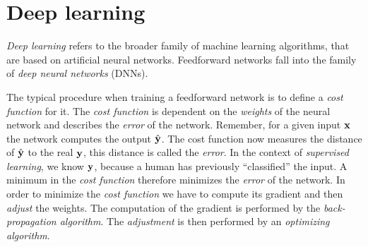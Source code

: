 \section{Deep learning}
\label{sec:deep-learning}

\emph{Deep learning} refers to the broader family of machine learning algorithms, that are based on artificial neural networks.
Feedforward networks fall into the family of \emph{deep neural networks} (DNNs).

The typical procedure when training a feedforward network is to define a \emph{cost function} for it.
The \emph{cost function} is dependent on the \emph{weights} of the neural network and describes the \emph{error} of the network.
Remember, for a given input \(\mathbf{x}\) the network computes the output \(\hat{\mathbf{y}}\).
The cost function now measures the distance of \(\hat{\mathbf{y}}\) to the real \(\mathbf{y}\), this distance is called the \emph{error}.
In the context of \emph{supervised learning}, we know \(\mathbf{y}\), because a human has previously \enquote{classified} the input.
A minimum in the \emph{cost function} therefore minimizes the \emph{error} of the network.
In order to minimize the \emph{cost function} we have to compute its gradient and then \emph{adjust} the weights.
The computation of the gradient is performed by the \emph{back-propagation algorithm}.
The \emph{adjustment} is then performed by an \emph{optimizing algorithm}.
